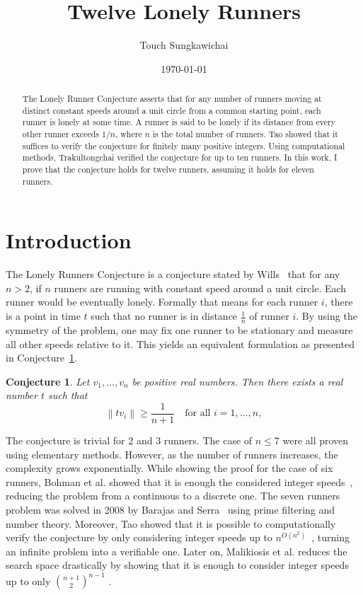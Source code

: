 \documentclass[10pt,leqno]{amsart}
\newtheorem{conjecture}[theorem]{Conjecture}
\newcommand{\norm}[1]{\left\|#1\right\|}
\begin{document}
\title{Twelve Lonely Runners}
\author[T. Sungkawichai]{Touch Sungkawichai}
\date{\today}
\address{London, United Kingdom}
\maketitle

\begin{abstract}
  The Lonely Runner Conjecture asserts that for any number of runners moving at distinct constant speeds around a unit circle
  from a common starting point, each runner is lonely at some time. A runner is said to be lonely if its distance from every 
  other runner exceeds $1/n$, where $n$ is the total number of runners. 
  Tao\cite{Tao} showed that it suffices to verify the conjecture for finitely many positive integers. 
  Using computational methods, Trakultongchai\cite{Trakultongchai} verified the conjecture for up to ten runners.
  In this work, I prove that the conjecture holds for twelve runners, assuming it holds for eleven runners.
\end{abstract}

\bigskip
\section*{Introduction}
The Lonely Runners Conjecture is a conjecture stated by Wills~\cite{Wills} that for any $n > 2$, if $n$ runners are 
running with constant speed around a unit circle. Each runner would be eventually lonely. Formally that means for each runner $i$, 
there is a point in time $t$ such that no runner is in distance $\frac{1}{n}$ of runner $i$.
By using the symmetry of the problem, one may fix one runner to be stationary and measure all other speeds relative to it. 
This yields an equivalent formulation as presented in Conjecture~\ref{lonelyconj}.

\begin{conjecture}
  Let $v_1, \dots, v_n$ be positive real numbers. Then there exists a real number $t$ such that
\[
  \norm{t v_i} \ge \frac{1}{n+1}
\quad \text{for all } i = 1,\dots,n,
\]
  \label{lonelyconj}
\end{conjecture}

The conjecture is trivial for 2 and 3 runners. The case of $n \le 7$ were all proven using elementary methods.
However, as the number of runners increases, the complexity grows exponentially.
While showing the proof for the case of six runners, Bohman et al. showed that it is 
enough the considered integer speeds~\cite{Bohman}, reducing the problem from a continuous to a discrete one. 
The seven runners problem was solved in 2008 by Barajas and Serra~\cite{sevenrunners} using prime filtering and number theory.
Moreover, Tao showed that it is possible to computationally verify the conjecture by only considering integer speeds 
up to $n^{O(n^2)}$~\cite{Tao}, turning an infinite problem into a verifiable one. 
Later on, Malikiosis et al. reduces the search space drastically by showing that it is enough 
to consider integer speeds up to only $\binom{n+1}{2}^{n-1}$ \cite{Malikiosis}.
\end{document}
